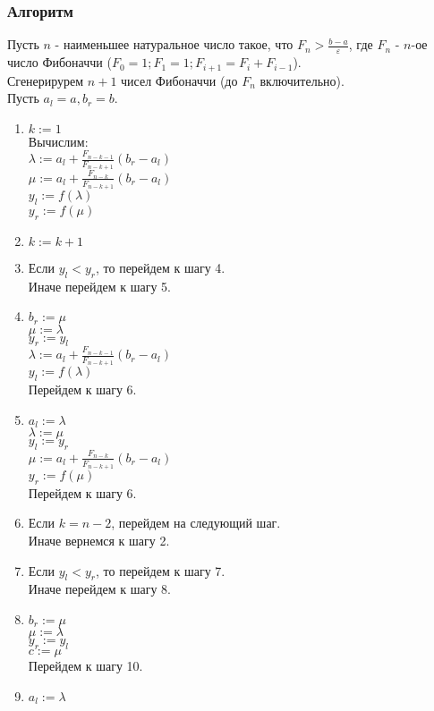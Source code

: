 \subsubsection{Алгоритм}
Пусть $n$ - наименьшее натуральное число такое, что $F_n > \frac{b-a}{\varepsilon}$, где $F_n$ - $n$-ое число Фибоначчи ($F_0=1; F_1=1; F_{i+1}=F_i+F_{i-1}$).\\
Сгенерирурем $n+1$ чисел Фибоначчи (до $F_n$ включительно).\\
Пусть $a_l = a, b_r=b$.
\begin{enumerate}
	\item $k:=1$\\
	Вычислим:\\
	$\lambda:=a_l+\frac{F_{n-k-1}}{F_{n-k+1}}(b_r-a_l)$\\
	$\mu:=a_l+\frac{F_{n-k}}{F_{n-k+1}}(b_r-a_l)$\\
	$y_l := f(\lambda)$\\
	$y_r := f(\mu)$
	\item $k:=k+1$
	\item Если $y_l < y_r$, то перейдем к шагу 4.\\
	Иначе перейдем к шагу 5.
	\item $b_r :=\mu$\\
	$\mu:=\lambda$\\
	$y_r:=y_l$\\
	$\lambda:=a_l+\frac{F_{n-k-1}}{F_{n-k+1}}(b_r-a_l)$\\
	$y_l := f(\lambda)$\\
	Перейдем к шагу 6.
	\item $a_l:=\lambda$\\
	$\lambda:=\mu$\\
	$y_l:=y_r$\\
	$\mu:=a_l+\frac{F_{n-k}}{F_{n-k+1}}(b_r-a_l)$\\
	$y_r := f(\mu)$\\
	Перейдем к шагу 6.
	\item Если $k=n-2$, перейдем на следующий шаг.\\
	Иначе вернемся к шагу 2.
	\item Если $y_l < y_r$, то перейдем к шагу 7.\\
	Иначе перейдем к шагу 8.
	\item $b_r :=\mu$\\
	$\mu:=\lambda$\\
	$y_r:=y_l$\\
	$c:=\mu$\\
	Перейдем к шагу 10.
	\item $a_l:=\lambda$\\

\end{enumerate}
